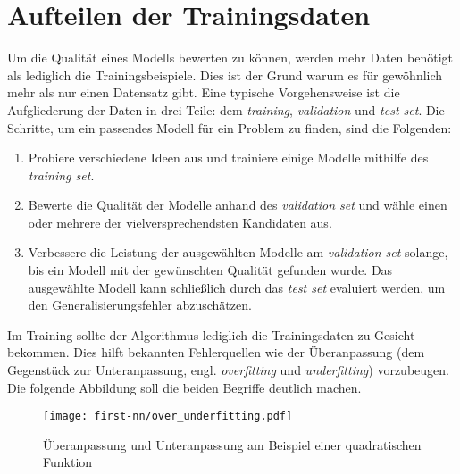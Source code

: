 \section{Aufteilen der Trainingsdaten}
Um die Qualität eines Modells bewerten zu können, werden
mehr Daten benötigt als lediglich die Trainingsbeispiele.
Dies ist der Grund warum es für gewöhnlich mehr als nur einen
Datensatz gibt. Eine typische Vorgehensweise ist die Aufgliederung der Daten
in drei Teile: dem \textit{training}, \textit{validation} und \textit{test set}.
Die Schritte, um ein passendes Modell für ein Problem zu finden, sind die Folgenden:
\begin{enumerate}
  \item Probiere verschiedene Ideen aus und trainiere einige Modelle mithilfe des
        \textit{training set}.
  \item Bewerte die Qualität der Modelle anhand des \textit{validation set} und wähle
        einen oder mehrere der vielversprechendsten Kandidaten aus.
  \item Verbessere die Leistung der ausgewählten Modelle am \textit{validation set}
        solange, bis ein Modell mit der gewünschten Qualität gefunden wurde.
        Das ausgewählte Modell kann schließlich durch das
        \textit{test set} evaluiert werden, um den Generalisierungsfehler abzuschätzen.
\end{enumerate}
Im Training sollte der Algorithmus lediglich die Trainingsdaten
zu Gesicht bekommen. Dies hilft bekannten
Fehlerquellen wie der Überanpassung (dem Gegenstück zur Unteranpassung, engl.
\textit{overfitting} und \textit{underfitting}) vorzubeugen.
Die folgende Abbildung soll die beiden Begriffe deutlich machen.
\begin{figure}[h!]
  \centering
  \texttt{[image: first-nn/over\_underfitting.pdf]}
  \caption{Überanpassung und Unteranpassung am Beispiel einer
  quadratischen Funktion \parencite[131]{book:hands-on-ml}}
\end{figure}

